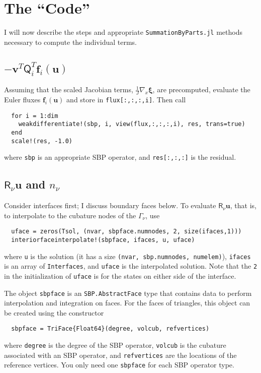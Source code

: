 \documentclass[11pt]{article} %
\newcommand{\mat}[1]{\ensuremath{\mathsf{#1}}}
\newcommand{\Q}[1]{\mat{Q}_{#1}}
\newcommand{\R}[0]{\mat{R}}
\begin{document}
\newpage

\section*{The ``Code''}

I will now describe the steps and appropriate \texttt{SummationByParts.jl}
methods necessary to compute the individual terms.

\subsection*{$-\bm{v}^{T} \Q{i}^{T} \bm{f}_{i}(\bm{u})$}

Assuming that the scaled Jacobian terms, $\frac{1}{J}\nabla_x \boldsymbol{\xi}$,
are precomputed, evaluate the Euler fluxes $\bm{f}_{i}(\bm{u})$ and store in
\texttt{flux[:,:,:,i]}.  Then call
\begin{lstlisting}
  for i = 1:dim
    weakdifferentiate!(sbp, i, view(flux,:,:,:,i), res, trans=true)
  end
  scale!(res, -1.0)
\end{lstlisting}
where \texttt{sbp} is an appropriate SBP operator, and \texttt{res[:,:,:]} is
the residual.

\subsection*{$\R_{\nu} \bm{u}$ and $n_{\nu}$}

Consider interfaces first; I discuss boundary faces below.  To evaluate
$\R_{\nu} \bm{u}$, that is, to interpolate to the cubature nodes of the
$\Gamma_{\nu}$, use
\begin{lstlisting}
  uface = zeros(Tsol, (nvar, sbpface.numnodes, 2, size(ifaces,1)))
  interiorfaceinterpolate!(sbpface, ifaces, u, uface)
\end{lstlisting}
where \texttt{u} is the solution (it has a size \texttt{(nvar, sbp.numnodes,
  numelem)}), \texttt{ifaces} is an array of \texttt{Interfaces}, and
\texttt{uface} is the interpolated solution.  Note that the \texttt{2} in the
initialization of \texttt{uface} is for the states on either side of the
interface.

The object \texttt{sbpface} is an \texttt{SBP.AbstractFace} type that contains
data to perform interpolation and integration on faces.  For the faces of
triangles, this object can be created using the constructor
\begin{lstlisting}
  sbpface = TriFace{Float64}(degree, volcub, refvertices)
\end{lstlisting}
where \texttt{degree} is the degree of the SBP operator, \texttt{volcub} is the
cubature associated with an SBP operator, and \texttt{refvertices} are the
locations of the reference vertices.  You only need one \texttt{sbpface} for
each SBP operator type.
\end{document}
